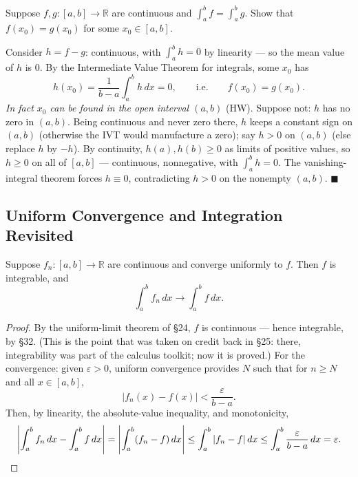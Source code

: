 \documentclass[11pt]{report}
\begin{document}
\begin{exbox}
Suppose $f, g: [a,b] \to \mathbb{R}$ are continuous and $\int_a^b f = \int_a^b g$. Show that $f(x_0) = g(x_0)$ for some $x_0 \in [a,b]$.

Consider $h = f - g$: continuous, with $\int_a^b h = 0$ by linearity --- so the mean value of $h$ is $0$. By the Intermediate Value Theorem for integrals, some $x_0$ has
\[
h(x_0) = \frac{1}{b-a}\int_a^b h\,dx = 0, \qquad \text{i.e.} \qquad f(x_0) = g(x_0).
\]
\emph{In fact $x_0$ can be found in the open interval $(a,b)$} (HW). Suppose not: $h$ has no zero in $(a,b)$. Being continuous and never zero there, $h$ keeps a constant sign on $(a,b)$ (otherwise the IVT would manufacture a zero); say $h > 0$ on $(a,b)$ (else replace $h$ by $-h$). By continuity, $h(a), h(b) \geq 0$ as limits of positive values, so $h \geq 0$ on all of $[a,b]$ --- continuous, nonnegative, with $\int_a^b h = 0$. The vanishing-integral theorem forces $h \equiv 0$, contradicting $h > 0$ on the nonempty $(a,b)$. \hfill $\blacksquare$
\end{exbox}

\subsection{Uniform Convergence and Integration Revisited}

\begin{thmbox}
Suppose $f_n: [a,b] \to \mathbb{R}$ are continuous and converge uniformly to $f$. Then $f$ is integrable, and
\[
\int_a^b f_n\,dx \longrightarrow \int_a^b f\,dx.
\]
\end{thmbox}

\begin{proof}
By the uniform-limit theorem of \S 24, $f$ is continuous --- hence integrable, by \S 32. (This is the point that was taken on credit back in \S 25: there, integrability was part of the calculus toolkit; now it is proved.) For the convergence: given $\varepsilon > 0$, uniform convergence provides $N$ such that for $n \geq N$ and all $x \in [a,b]$,
\[
|f_n(x) - f(x)| < \frac{\varepsilon}{b-a}.
\]
Then, by linearity, the absolute-value inequality, and monotonicity,
\[
\left| \int_a^b f_n\,dx - \int_a^b f\,dx \right| = \left| \int_a^b (f_n - f)\,dx \right| \leq \int_a^b |f_n - f|\,dx \leq \int_a^b \frac{\varepsilon}{b-a}\,dx = \varepsilon. \qedhere
\]
\end{proof}

\end{document}
